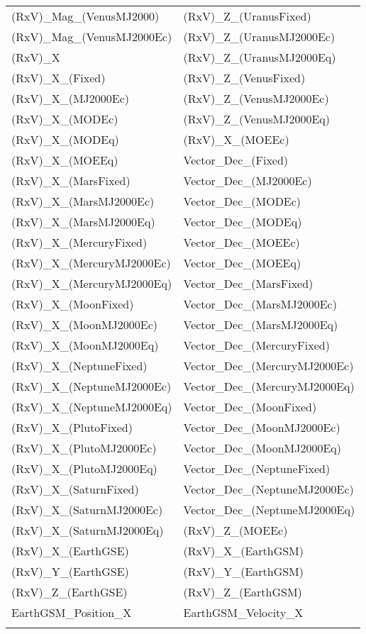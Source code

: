 \begin{table}[htbp!]
\begin{tabular}{ll}
    (RxV)\_Mag\_(VenusMJ2000) & (RxV)\_Z\_(UranusFixed)\\
    (RxV)\_Mag\_(VenusMJ2000Ec) & (RxV)\_Z\_(UranusMJ2000Ec)\\
    (RxV)\_X & (RxV)\_Z\_(UranusMJ2000Eq)\\
    (RxV)\_X\_(Fixed) & (RxV)\_Z\_(VenusFixed)\\
    (RxV)\_X\_(MJ2000Ec) & (RxV)\_Z\_(VenusMJ2000Ec)\\
    (RxV)\_X\_(MODEc) & (RxV)\_Z\_(VenusMJ2000Eq)\\
    (RxV)\_X\_(MODEq) & (RxV)\_X\_(MOEEc)\\
    (RxV)\_X\_(MOEEq) & Vector\_Dec\_(Fixed)\\
    (RxV)\_X\_(MarsFixed) & Vector\_Dec\_(MJ2000Ec)\\
    (RxV)\_X\_(MarsMJ2000Ec) & Vector\_Dec\_(MODEc)\\
    (RxV)\_X\_(MarsMJ2000Eq) & Vector\_Dec\_(MODEq)\\
    (RxV)\_X\_(MercuryFixed) & Vector\_Dec\_(MOEEc)\\
    (RxV)\_X\_(MercuryMJ2000Ec) & Vector\_Dec\_(MOEEq)\\
    (RxV)\_X\_(MercuryMJ2000Eq) & Vector\_Dec\_(MarsFixed)\\
    (RxV)\_X\_(MoonFixed) & Vector\_Dec\_(MarsMJ2000Ec)\\
    (RxV)\_X\_(MoonMJ2000Ec) & Vector\_Dec\_(MarsMJ2000Eq)\\
    (RxV)\_X\_(MoonMJ2000Eq) & Vector\_Dec\_(MercuryFixed)\\
    (RxV)\_X\_(NeptuneFixed) & Vector\_Dec\_(MercuryMJ2000Ec)\\
    (RxV)\_X\_(NeptuneMJ2000Ec) & Vector\_Dec\_(MercuryMJ2000Eq)\\
    (RxV)\_X\_(NeptuneMJ2000Eq) & Vector\_Dec\_(MoonFixed)\\
    (RxV)\_X\_(PlutoFixed) & Vector\_Dec\_(MoonMJ2000Ec)\\
    (RxV)\_X\_(PlutoMJ2000Ec) & Vector\_Dec\_(MoonMJ2000Eq)\\
    (RxV)\_X\_(PlutoMJ2000Eq) & Vector\_Dec\_(NeptuneFixed)\\
    (RxV)\_X\_(SaturnFixed) & Vector\_Dec\_(NeptuneMJ2000Ec)\\
    (RxV)\_X\_(SaturnMJ2000Ec) & Vector\_Dec\_(NeptuneMJ2000Eq)\\
    (RxV)\_X\_(SaturnMJ2000Eq) & (RxV)\_Z\_(MOEEc)\\
    (RxV)\_X\_(EarthGSE) & (RxV)\_X\_(EarthGSM)\\
    (RxV)\_Y\_(EarthGSE) & (RxV)\_Y\_(EarthGSM)\\
    (RxV)\_Z\_(EarthGSE) & (RxV)\_Z\_(EarthGSM)\\
    EarthGSM\_Position\_X & EarthGSM\_Velocity\_X\\
\label{Table: AstroCalcVectorElems1}
\end{tabular}
\end{table}

